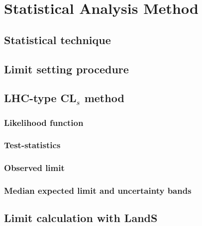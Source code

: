 \chapter{Statistical Analysis Method}


\section{Statistical technique}


\section{Limit setting procedure}


\section{LHC-type CL\texorpdfstring{$_{s}$}{s} method}


\subsection{Likelihood function}


\subsection{Test-statistics}


\subsection{Observed limit}

\subsection{Median expected limit and uncertainty bands}
  

\section{Limit calculation with LandS}